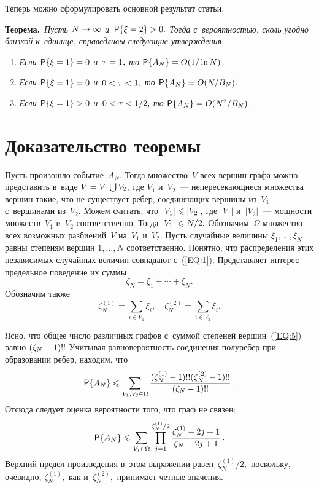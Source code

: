 \begin{multicols}{2}
Теперь можно сформулировать основной результат статьи.

\smallskip

\noindent
\textbf{Теорема.}\ \textit{Пусть $N\hm\rightarrow \infty$ и~$\mathsf{P}\{\xi \hm= 2\}\hm>0.$ 
Тогда с~вероятностью, сколь угодно близкой к~единице,
справедливы следующие утверждения}.
\begin{enumerate}
\item \textit{Если $\mathsf{P}\{\xi = 1\}\hm=0$ и~$\tau\hm =1,$ то $\mathsf{P}\{A_N\}\hm=O(1/\ln N)$}.
\item \textit{Если $\mathsf{P}\{\xi = 1\}\hm=0$ и~$0<\tau \hm<1,$ то $\mathsf{P}\{A_N\}\hm=O(N/B_N)$}.
\item \textit{Если $\mathsf{P}\{\xi = 1\}\hm>0$ и~$0<\tau\hm <1/2,$ то $\mathsf{P}\{A_N\}\hm=O(N^2/B_N)$}.
\end{enumerate}

\section{Доказательство теоремы} 
\label{SC:3}

Пусть произошло событие~$A_N.$ Тогда множество~$V$ всех вершин графа можно представить в~виде 
$V\hm=V_1\bigcup V_2,$ где $V_1$ и~$V_2$~--- 
непересекающиеся множества вершин такие, что не существует ребер, соединяющих вершины из~$V_1$ 
с~вершинами из~$V_2.$ Можем считать, что $|V_1| \hm \leqslant |V_2|,$ где $|V_1|$ и~$|V_2|$~--- 
мощности множеств~$V_1$ и~$V_2$ соответственно. Тогда $|V_1| \hm \leqslant N/2.$ 
Обозначим~$\Omega$ множество всех возможных разбиений~$V$ на~$V_1$ и~$V_2.$ 
Пусть случайные величины $\xi_1,\ldots, \xi_N$ равны степеням вершин $1,\ldots, N$ 
соответственно. Понятно, что распределения этих независимых случайных величин совпадают с~(\ref{EQ:1}). 
Представляет интерес предельное поведение их суммы
\begin{equation}
\label{EQ:5}
\zeta_N=\xi_1+\cdots +\xi_N.
\end{equation}
Обозначим также
\begin{equation}
\label{EQ:6}
\zeta_N^{(1)}=\sum\limits_{i\in V_1} \xi_i, \quad  \zeta_N^{(2)}=\sum\limits_{i\in V_2} \xi_i.
\end{equation}

Ясно, что общее число различных графов с~суммой степеней вершин~(\ref{EQ:5}) равно 
$(\zeta_N\hm-1)!!$ Учитывая равновероятность соединения полуребер при образовании ребер, находим, что
$$
\mathsf{P}\{A_N\}\leqslant \sum\limits_{V_1,V_2\in \Omega} 
\displaystyle\frac{\displaystyle (\zeta_N^{(1)}-1)!!(\zeta_N^{(2)}-1)!!\mathstrut}{\displaystyle (\zeta_N-1)!!\mathstrut}\,.
$$
Отсюда следует оценка вероятности того, что граф не связен:
\begin{equation*}
\mathsf{P}\{A_N\} \leqslant \sum\limits_{V_1\in \Omega} \prod\limits_{j=1}^{\zeta_N^{(1)}/2} 
\displaystyle\frac{\displaystyle \zeta_N^{(1)}-2j+1\mathstrut}{\displaystyle \zeta_N-2j+1\mathstrut}\,.
\end{equation*}
Верхний предел произведения в~этом выражении равен~$\zeta_N^{(1)}/2,$ 
поскольку, очевидно, $\zeta_N^{(1)},$ как и~$\zeta_N^{(2)},$ принимает четные значения.


\end{multicols}
